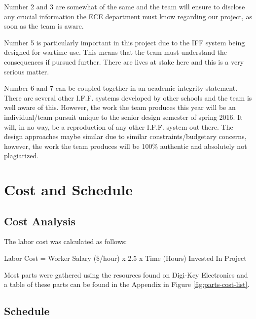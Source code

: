 \documentclass[letterpaper,10pt]{article}
\begin{document}
\begin{spacing}{1.15}
Number 2 and 3 are somewhat of the same and the team will ensure to disclose any crucial information the ECE department must know regarding our project, as soon as the team is aware. 

Number 5 is particularly important in this project due to the IFF system being designed for wartime use. This means that the team must understand the consequences if pursued further. There are lives at stake here and this is a very serious matter. 

Number 6 and 7 can be coupled together in an academic integrity statement. There are several other I.F.F. systems developed by other schools and the team is well aware of this. However, the work the team produces this year will be an individual/team pursuit unique to the senior design semester of spring 2016. It will, in no way, be a reproduction of any other I.F.F. system out there. The design approaches maybe similar due to similar constraints/budgetary concerns, however, the work the team produces will be 100\% authentic and absolutely not plagiarized. 

\section{Cost and Schedule}

\subsection{Cost Analysis}
The labor cost was calculated as follows:

\begin{center}
	Labor Cost = Worker Salary (\$/hour) x 2.5 x Time (Hours) Invested In Project
\end{center}

Most parts were gathered using the resources found on Digi-Key Electronics and a table of these parts can be found in the Appendix in Figure \ref{fig:parts-cost-list}. \\

\subsection{Schedule}


\end{spacing}
\end{document}
